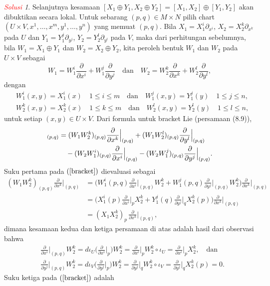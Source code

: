 \documentclass[11pt]{article}
\theoremstyle{definition}
\theoremstyle{remark}
\newtheorem*{solution}{\textcolor{red}{Solusi}}
\newcommand{\ddxi}{\frac{\partial}{\partial x^i}}
\newcommand{\ddxk}{\frac{\partial}{\partial x^k}}
\newcommand{\ddyj}{\frac{\partial}{\partial y^j}}
\newcommand{\ddyl}{\frac{\partial}{\partial y^l}}
\begin{document}
\begin{solution}
Selanjutnya kesamaan $[X_1 \oplus Y_1,X_2 \oplus Y_2] = [X_1,X_2] \oplus [Y_1,Y_2]$ akan dibuktikan secara lokal. Untuk sebarang $(p,q) \in M \times N$ pilih chart $(U\times V, x^1,\dots,x^m,y^1,\dots,y^n)$ yang memuat $(p,q)$. Bila $X_1  = X_1^i \partial_{x^i}$, $X_2 = X_2^k \partial_{x^k}$ pada $U$ dan $Y_1 = Y_1^j \partial_{y^j}$, $Y_2 = Y_2^l \partial_{y^l}$ pada $V$, maka dari perhitungan sebelumnya, bila $W_1 = X_1 \oplus Y_1$ dan $W_2 = X_2 \oplus Y_2$, kita peroleh bentuk $W_1$ dan $W_2$ pada $U \times V$ sebagai
$$
W_1  =  W_1^i \ddxi +  W_1^j \ddyj \quad \text{dan} \quad W_2  =  W_2^k \ddxk +  W_2^l \ddyl, 
$$
dengan 
\begin{align*}
&W_1^i (x,y) = X_1^i(x) \quad 1\leq i \leq m \quad \text{dan} \quad  W_1^j (x,y) = Y_1^j(y) \quad 1\leq j \leq n, \\ 
&W_2^k (x,y) = X_2^k(x) \quad 1\leq k \leq m \quad \text{dan} \quad  W_2^l (x,y) = Y_2^l(y) \quad 1\leq l \leq n,
\end{align*}
untuk setiap $(x,y) \in U \times V$. Dari formula untuk bracket Lie (persamaan (8.9)),
\begin{align}
    [W_1,W_2]_{(p,q)} &= (W_1 W_2^k)_{(p,q)} \ddxk\Big|_{(p,q)} + (W_1 W_2^l)_{(p,q)} \ddyl\Big|_{(p,q)} \notag \\ &\quad- (W_2 W_1^i)_{(p,q)} \ddxi\Big|_{(p,q)} - (W_2W_1^j)_{(p,q)} \ddyj\Big|_{(p,q)}. \label{bracket}
\end{align}
Suku pertama pada $(\ref{bracket})$ dievaluasi sebagai
\begin{align*}
    (W_1W_2^k)_{(p,q)} \ddxk\Big|_{(p,q)} &= \Big( W_1^i(p,q) \ddxi\Big|_{(p,q)} W_2^k + W_1^j(p,q) \ddyj\Big|_{(p,q)} W_2^k \Big) \ddxk\Big|_{(p,q)} \\
    &= \Big( X_1^i(p) \ddxi\Big|_p X_2^k  + Y_1^j(q) \ddyj\Big|_q X_2^k(p) \Big) \ddxk\Big|_{(p,q)} \\
    &= (X_1 X_2^k)_p\, \ddxk\Big|_{(p,q)},
\end{align*}
dimana kesamaan kedua dan ketiga persamaan di atas adalah hasil dari  observasi bahwa
\begin{align*}
    &\ddxi\Big|_{(p,q)} W_2^k = d\iota_U\Big( \ddxi\Big|_p \Big) W_2^k = \ddxi\Big|_p W_2^k \circ \iota_U =  \ddxi\Big|_p X_2^k,  \quad \text{dan} \\
    &\ddyj\Big|_{(p,q)} W_2^k = d\iota_V \Big( \ddyj\Big|_p \Big) W_2^k = \ddyj\Big|_q W_2^k \circ \iota_V = \ddyj\Big|_q X_2^k(p) = 0. 
\end{align*}
Suku ketiga pada $(\ref{bracket})$ adalah
\begin{align*}

\end{align*}
\end{solution}
\end{document}
